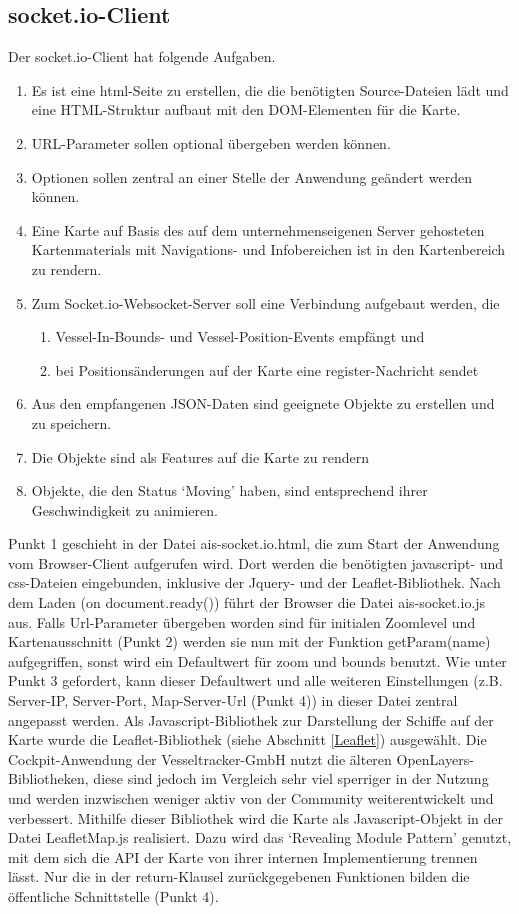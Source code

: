 \subsection{socket.io-Client}\label{socket.io-Client}
Der socket.io-Client hat folgende Aufgaben.
\begin{enumerate}
\item Es ist eine html-Seite zu erstellen, die die benötigten Source-Dateien lädt und eine HTML-Struktur aufbaut mit den DOM-Elementen für die Karte.
\item URL-Parameter sollen optional übergeben werden können.
\item Optionen sollen zentral an einer Stelle der Anwendung geändert werden können.
\item Eine Karte auf Basis des auf dem unternehmenseigenen Server gehosteten Kartenmaterials mit Navigations- und Infobereichen ist in den Kartenbereich zu rendern.
\item Zum Socket.io-Websocket-Server soll eine Verbindung aufgebaut werden, die
\begin{enumerate}
\item Vessel-In-Bounds- und Vessel-Position-Events empfängt und
\item bei Positionsänderungen auf der Karte eine register-Nachricht sendet
\end{enumerate}
\item Aus den empfangenen JSON-Daten sind geeignete Objekte zu erstellen und zu speichern.
\item Die Objekte sind als Features auf die Karte zu rendern
\item Objekte, die den Status ‘Moving’ haben, sind entsprechend ihrer Geschwindigkeit zu animieren.
\end{enumerate}
Punkt 1 geschieht in der Datei ais-socket.io.html, die zum Start der Anwendung vom Browser-Client aufgerufen wird. Dort werden die benötigten javascript- und css-Dateien eingebunden, inklusive der Jquery- und der Leaflet-Bibliothek. Nach dem Laden (on document.ready()) führt der Browser die Datei ais-socket.io.js aus. Falls Url-Parameter übergeben worden sind für initialen Zoomlevel und Kartenausschnitt (Punkt 2) werden sie nun mit der Funktion getParam(name) aufgegriffen, sonst wird ein Defaultwert für zoom und bounds benutzt. Wie unter Punkt 3 gefordert, kann dieser Defaultwert und alle weiteren Einstellungen (z.B. Server-IP, Server-Port, Map-Server-Url (Punkt 4)) in dieser Datei zentral angepasst werden.
Als Javascript-Bibliothek zur Darstellung der Schiffe auf der Karte wurde die Leaflet-Bibliothek (siehe Abschnitt \ref{Leaflet}) ausgewählt. Die Cockpit-Anwendung der Vesseltracker-GmbH nutzt die älteren OpenLayers-Bibliotheken, diese sind jedoch im Vergleich sehr viel sperriger in der Nutzung und werden inzwischen weniger aktiv von der Community weiterentwickelt und verbessert.
Mithilfe dieser Bibliothek wird die Karte als Javascript-Objekt in der Datei LeafletMap.js realisiert. Dazu wird das ‘Revealing Module Pattern’ genutzt, mit dem sich die API der Karte von ihrer internen Implementierung trennen lässt. Nur die in der return-Klausel zurückgegebenen Funktionen bilden die öffentliche Schnittstelle (Punkt 4). 

